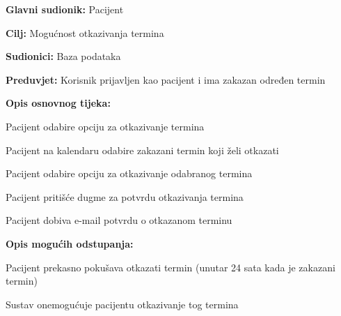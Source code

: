 \noindent {}
\begin{packed_item}
	
	\item \textbf{Glavni sudionik: }Pacijent
	\item  \textbf{Cilj:} Mogućnost otkazivanja termina 
	\item  \textbf{Sudionici:} Baza podataka
	\item  \textbf{Preduvjet:} Korisnik prijavljen kao pacijent i ima zakazan određen termin
	\item  \textbf{Opis osnovnog tijeka:}
	
	\item[] \begin{packed_enum}
		
		\item Pacijent odabire opciju za otkazivanje termina
		\item Pacijent na kalendaru odabire zakazani termin koji želi otkazati
		\item Pacijent odabire opciju za otkazivanje odabranog termina
		\item Pacijent pritišće dugme za potvrdu otkazivanja termina
		\item Pacijent dobiva e-mail potvrdu o otkazanom terminu
	\end{packed_enum}
	
	\item  \textbf{Opis mogućih odstupanja:}
	
	\item[] \begin{packed_item}
		
		\item[3.a] Pacijent prekasno pokušava otkazati termin (unutar 24 sata kada je zakazani termin)
		\item[] \begin{packed_enum}
			
			\item Sustav onemogućuje pacijentu otkazivanje tog termina
			
		\end{packed_enum}
		
	\end{packed_item}
\end{packed_item}

